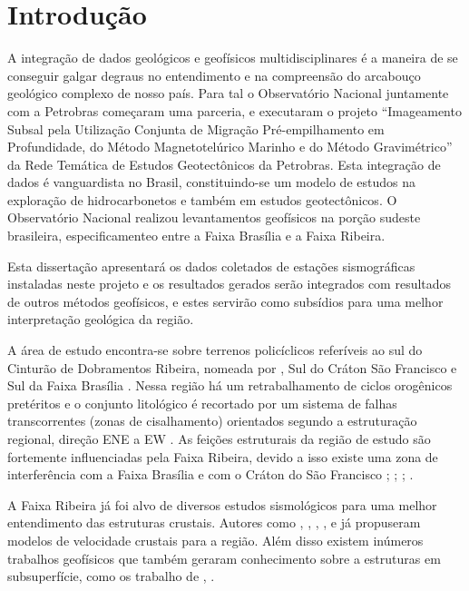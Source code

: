 \chapter{Introdução}

A integração de dados geológicos e geofísicos multidisciplinares é a maneira de se conseguir galgar degraus no entendimento e na compreensão do arcabouço geológico complexo de nosso país. Para tal o Observatório Nacional juntamente com a Petrobras começaram uma parceria, e executaram o projeto “Imageamento Subsal pela Utilização Conjunta de Migração Pré-empilhamento em Profundidade, do Método Magnetotelúrico Marinho e do Método Gravimétrico” da Rede Temática de Estudos Geotectônicos da Petrobras. Esta integração de dados é vanguardista no Brasil, constituindo-se um modelo de estudos na exploração de hidrocarbonetos e também em estudos geotectônicos. O Observatório Nacional realizou levantamentos geofísicos na porção sudeste brasileira, especificamenteo entre a Faixa Brasília e a Faixa Ribeira. 

Esta dissertação apresentará os dados coletados de estações sismográficas instaladas neste projeto e os resultados gerados serão integrados com resultados de outros métodos geofísicos, e estes servirão como subsídios para uma melhor interpretação geológica da região. 

A área de estudo encontra-se sobre terrenos policíclicos referíveis ao sul do Cinturão de Dobramentos Ribeira, nomeada por \cite{Riccomini_1989}, Sul do Cráton São Francisco e Sul da Faixa Brasília \citep{Almeida_Carneiro_1998}. Nessa região há um retrabalhamento de ciclos orogênicos pretéritos e o conjunto litológico é recortado por um sistema de falhas transcorrentes (zonas de cisalhamento) orientados segundo a estruturação regional, direção ENE a EW  \citep{Hasui_Sadowski_1976}. As feições estruturais da região de estudo são fortemente influenciadas pela Faixa Ribeira, devido a isso existe uma zona de interferência com a Faixa Brasília e com o Cráton do São Francisco \citep{kuhn_metamorphic_2004}; \citep{heilbron_evolution_2010}; \citep{valeriano_u_pb_2011}; \citep{heilbron_serra_2013}.

A Faixa Ribeira já foi alvo de diversos estudos sismológicos para uma melhor entendimento das estruturas crustais. Autores como \cite{Bassini_1986}, \cite{souza_crustal_1991}, \cite{souza_shear-wave_1995}, \cite{assumpcao_crustal_2002}, \cite{dias_cario_crustal_2006} e \cite{sand_franca_crustal_2004} já propuseram modelos de velocidade crustais para a região. Além disso existem inúmeros trabalhos geofísicos que também geraram conhecimento sobre a estruturas em subsuperfície, como os trabalho de \cite{flora_solon_ancient_2013}, \cite{Silva_2014}. 

